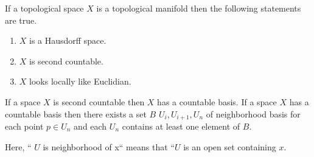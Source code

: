 \documentclass{article}
\newtheorem{theorem}{Theorem}[section]
\newtheorem{proposition}[theorem]{Proposition}
\newtheorem{example}[theorem]{Example}
\begin{document}
If a topological space $ X $ is a topological manifold then the following statements are true.

\begin{enumerate}
\item $ X $ is a Hausdorff space.
\item $ X $ is second countable.
\item $ X $ looks locally like Euclidian.
\end{enumerate}

If a space $ X $ is second countable then $ X $ has a countable basis. If a space $ X $ has a countable basis then there exists a set $ B $ $ U_{i}, U_{i+1}, U_{n} $ of neighborhood basis for each point $ p \in U_{n} $ and each $ U_{n} $ contains at least one element of $ B $.

Here, `` $ U $ is neighborhood of x`` means that ``$ U $ is an open set containing $ x $.









\end{document}
